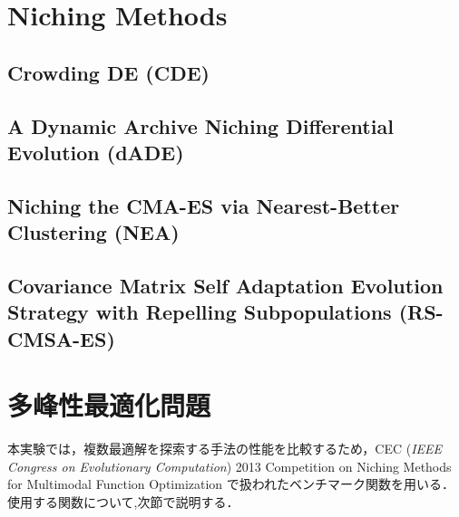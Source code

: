\documentclass[a4j,11pt]{jarticle}
\begin{document}

\newpage
\section{Niching Methods}
\label{sec:nm}


\subsection{Crowding DE (CDE)}
\label{ss:cde}

\subsection{A Dynamic Archive Niching Differential Evolution (dADE)}
\label{ss:dADE}

\subsection{Niching the CMA-ES via Nearest-Better Clustering (NEA)}
\label{ss:nea}


\subsection{Covariance Matrix Self Adaptation Evolution Strategy with Repelling Subpopulations (RS-CMSA-ES)}
\label{ss:rs-cmsa-es}

\newpage
\section{多峰性最適化問題}
\label{sec:MOP}
本実験では，複数最適解を探索する手法の性能を比較するため，CEC ({\it IEEE Congress on Evolutionary Computation}) 2013 Competition on Niching Methods for Multimodal Function Optimization \cite{CEC2013} で扱われたベンチマーク関数を用いる．使用する関数について,次節で説明する．
\end{document}
